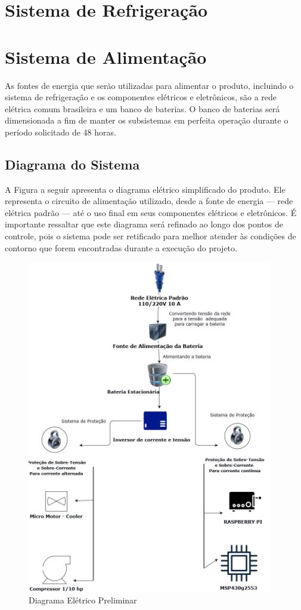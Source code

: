 \section{Sistema de Refrigeração}

\section{Sistema de Alimentação}
As fontes de energia que serão utilizadas para alimentar o produto, incluindo o sistema de refrigeração e os componentes elétricos e eletrônicos, são a rede elétrica comum brasileira e um banco de baterias. O banco de baterias será dimensionada a fim de manter os subsistemas em perfeita operação durante o período solicitado de 48 horas.

\subsection{Diagrama do Sistema}
A Figura a seguir apresenta o diagrama elétrico simplificado do produto. Ele representa o circuito de alimentação utilizado, desde a fonte de energia --- rede elétrica padrão --- até o uso final em seus componentes elétricos e eletrônicos.  É importante ressaltar que este diagrama será refinado ao longo dos pontos de controle, pois o  sistema pode ser retificado para melhor atender às condições de contorno que forem encontradas durante a execução do projeto.

\begin{figure}[H]
\begin{center}
\includegraphics[scale = 1.2]{figuras/Diagrama_Simp.JPG}
\caption{ Diagrama Elétrico Preliminar}
\end{center}
\end{figure}

